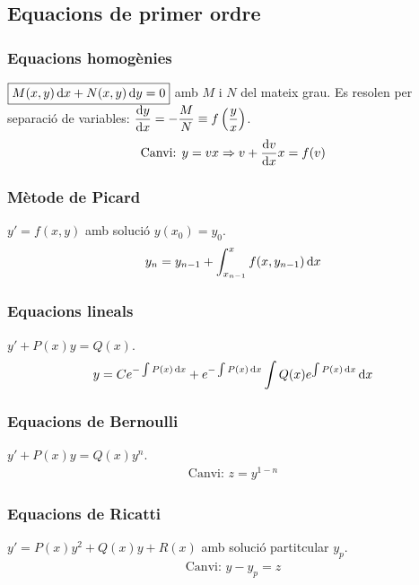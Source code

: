 \section{\mytitle}

\subsection*{Equacions de primer ordre}
\subsubsection*{Equacions homogènies}
$\boxed{M(x,y) \mathop{}\!\mathrm{d} x + N(x,y) \mathop{}\!\mathrm{d} y = 0}$ amb $M$ i $N$ del mateix grau. 
Es resolen per separació de variables: $\displaystyle \frac{\mathrm{d} y}{\mathrm{d} x} = - \frac{M}{N} \equiv f\left( \frac{y}{x} \right)$.
\begin{align}
    \text{Canvi: } y = vx \Rightarrow v + \frac{\mathrm{d} v}{\mathrm{d} x} x = f(v)
\end{align}

\subsubsection*{Mètode de Picard}
$\boxed{y' = f(x,y)}$ amb solució $y(x_{0}) = y_{0}$.
\begin{align}
    y_{n} = y_{n-1} + \int_{x_{n-1}}^{x} f(x, y_{n-1}) \mathop{}\!\mathrm{d} x
\end{align}

\subsubsection*{Equacions lineals}
$\boxed{y' + P(x) y = Q(x)}$.
\begin{align}
    y = C e^{-\int P(x) \mathop{}\!\mathrm{d} x} + e^{-\int P(x) \mathop{}\!\mathrm{d} x} \int Q(x) e^{\int P(x) \mathop{}\!\mathrm{d} x} \mathop{}\!\mathrm{d} x
\end{align}

\subsubsection*{Equacions de Bernoulli}
$\boxed{y' + P(x)y = Q(x)y^{n}}$.
\begin{align}
    \text{Canvi: } z = y^{1-n} 
\end{align}

\subsubsection*{Equacions de Ricatti}
$\boxed{y' = P(x)y^{2} + Q(x)y + R(x)}$ amb solució partitcular $y_{p}$.
\begin{align}
    \text{Canvi: } y - y_{p} = z
\end{align}

